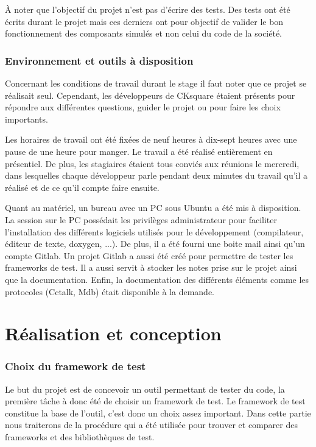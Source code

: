 \documentclass[a4paper]{article}
\begin{document}
À noter que l'objectif du projet n'est pas d'écrire des tests. Des tests ont été
écrits durant le projet mais ces derniers ont pour objectif de valider le bon
fonctionnement des composants simulés et non celui du code de la société.
\section{Environnement et outils à disposition}%

Concernant les conditions de travail durant le stage il faut noter que ce projet
se réalisait seul. Cependant, les développeurs de CKsquare étaient présents pour
répondre aux différentes questions, guider le projet ou pour faire les choix
importants.

Les horaires de travail ont été fixées de neuf heures à dix-sept heures avec une
pause de une heure pour manger. Le travail a été réalisé entièrement en
présentiel. De plus, les stagiaires étaient tous conviés aux réunions le
mercredi, dans lesquelles chaque développeur parle pendant deux minutes du
travail qu'il a réalisé et de ce qu'il compte faire ensuite.

Quant au matériel, un bureau avec un PC sous Ubuntu a été mis à disposition. La
session sur le PC possédait les privilèges administrateur pour faciliter
l'installation des différents logiciels utilisés pour le développement
(compilateur, éditeur de texte, doxygen, ...). De plus, il a été fourni une
boite mail ainsi qu'un compte Gitlab. Un projet Gitlab a aussi été créé pour
permettre de tester les frameworks de test. Il a aussi servit à stocker les
notes prise sur le projet ainsi que la documentation. Enfin, la documentation
des différents éléments comme les protocoles (Cctalk, Mdb) était disponible à la
demande.
\clearpage
\part{Réalisation et conception}

\section{Choix du framework de test}%

Le but du projet est de concevoir un outil permettant de tester du code, la
première tâche à donc été de choisir un framework de test. Le framework de test
constitue la base de l'outil, c'est donc un choix assez important. Dans cette
partie nous traiterons de la procédure qui a été utilisée pour trouver et
comparer des frameworks et des bibliothèques de test.
\end{document}
